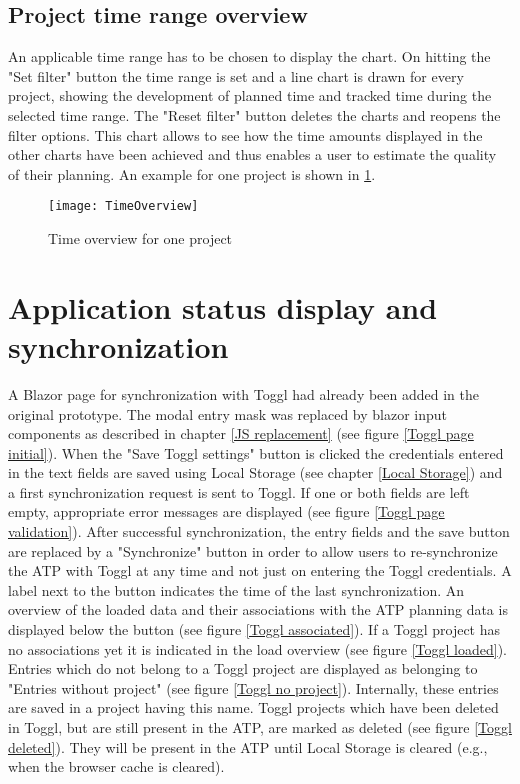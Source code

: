 \subsection{Project time range overview}
An applicable time range has to be chosen to display the chart. On hitting the "Set filter" button the time range is set and a line chart is drawn for every project, showing the development of planned time and tracked time during the selected time range. The "Reset filter" button deletes the charts and reopens the filter options. This chart allows to see how the time amounts displayed in the other charts have been achieved and thus enables a user to estimate the quality of their planning. An example for one project is shown in \ref{timeOverview}.
\begin{figure}[H]
	\centering
	\texttt{[image: TimeOverview]}
	\caption{Time overview for one project}
	\label{timeOverview}
\end{figure}

\section{Application status display and synchronization} \label{Status display}
A Blazor page for synchronization with Toggl had already been added in the original prototype. The modal entry mask was replaced by blazor input components as described in chapter \ref{JS replacement} (see figure \ref{Toggl page initial}). When the "Save Toggl settings" button is clicked the credentials entered in the text fields are saved using Local Storage (see chapter \ref{Local Storage}) and a first synchronization request is sent to Toggl. If one or both fields are left empty, appropriate error messages are displayed (see figure \ref{Toggl page validation}). After successful synchronization, the entry fields and the save button are replaced by a "Synchronize" button in order to allow users to re-synchronize the ATP with Toggl at any time and not just on entering the Toggl credentials. A label next to the button indicates the time of the last synchronization. An overview of the loaded data and their associations with the ATP planning data is displayed below the button (see figure \ref{Toggl associated}). If a Toggl project has no associations yet it is indicated in the load overview (see figure \ref{Toggl loaded}). Entries which do not belong to a Toggl project are displayed as belonging to "Entries without project" (see figure \ref{Toggl no project}). Internally, these entries are saved in a project having this name. Toggl projects which have been deleted in Toggl, but are still present in the ATP, are marked as deleted (see figure \ref{Toggl deleted}). They will be present in the ATP until Local Storage is cleared (e.g., when the browser cache is cleared).

